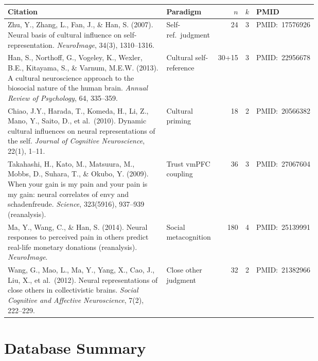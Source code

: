 \documentclass[11pt,a4paper]{report}
\newcommand{\pmid}[1]{\textcolor{midGray}{\small PMID:~#1}}
\begin{document}
\begin{longtable}{@{}p{0.55\linewidth}p{0.15\linewidth}rrl@{}}
\toprule
\textbf{Citation} & \textbf{Paradigm} & $n$ & $k$ & \textbf{PMID} \\
\midrule\endhead
Zhu, Y., Zhang, L., Fan, J., \& Han, S. (2007). Neural basis of cultural influence on
self-representation. \textit{NeuroImage}, 34(3), 1310--1316. &
Self-ref.\ judgment & 24 & 3 & \pmid{17576926} \\[4pt]

Han, S., Northoff, G., Vogeley, K., Wexler, B.E., Kitayama, S., \& Varnum, M.E.W. (2013).
A cultural neuroscience approach to the biosocial nature of the human brain.
\textit{Annual Review of Psychology}, 64, 335--359. &
Cultural self-reference & 30+15 & 3 & \pmid{22956678} \\[4pt]

Chiao, J.Y., Harada, T., Komeda, H., Li, Z., Mano, Y., Saito, D., et al.\ (2010). Dynamic
cultural influences on neural representations of the self.
\textit{Journal of Cognitive Neuroscience}, 22(1), 1--11. &
Cultural priming & 18 & 2 & \pmid{20566382} \\[4pt]

Takahashi, H., Kato, M., Matsuura, M., Mobbs, D., Suhara, T., \& Okubo, Y. (2009). When
your gain is my pain and your pain is my gain: neural correlates of envy and schadenfreude.
\textit{Science}, 323(5916), 937--939 (reanalysis). &
Trust vmPFC coupling & 36 & 3 & \pmid{27067604} \\[4pt]

Ma, Y., Wang, C., \& Han, S. (2014). Neural responses to perceived pain in others predict
real-life monetary donations (reanalysis). \textit{NeuroImage}. &
Social metacognition & 180 & 4 & \pmid{25139991} \\[4pt]

Wang, G., Mao, L., Ma, Y., Yang, X., Cao, J., Liu, X., et al.\ (2012). Neural
representations of close others in collectivistic brains.
\textit{Social Cognitive and Affective Neuroscience}, 7(2), 222--229. &
Close other judgment & 32 & 2 & \pmid{21382966} \\
\bottomrule
\end{longtable}

\section*{Database Summary}
\end{document}
